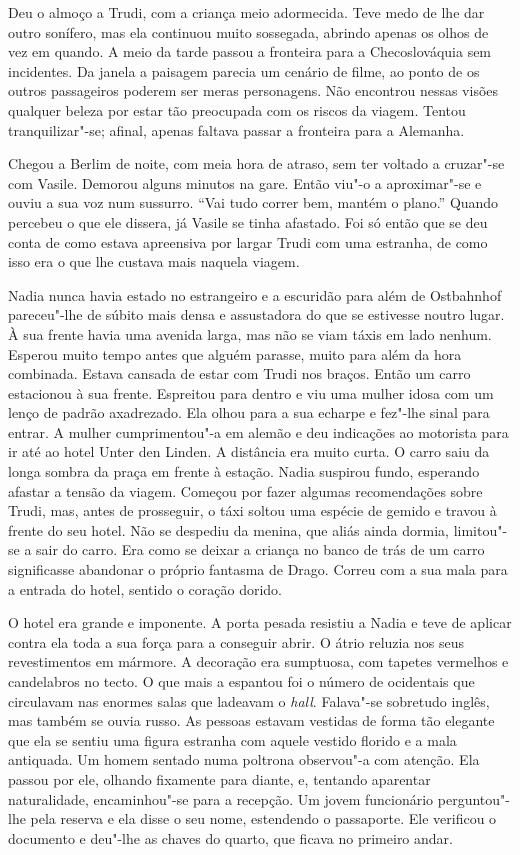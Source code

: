 Deu o almoço a Trudi, com a criança meio adormecida. Teve medo de lhe
dar outro sonífero, mas ela continuou muito sossegada, abrindo apenas os
olhos de vez em quando. A meio da tarde passou a fronteira para a Checoslováquia sem incidentes. Da janela a paisagem parecia um cenário de
filme, ao ponto de os outros passageiros poderem ser meras personagens.
Não encontrou nessas visões qualquer beleza por estar tão preocupada com
os riscos da viagem. Tentou tranquilizar"-se; afinal, apenas faltava
passar a fronteira para a Alemanha.

Chegou a Berlim de noite, com meia hora de atraso, sem ter voltado a
cruzar"-se com Vasile. Demorou alguns minutos na gare. Então viu"-o a
aproximar"-se e ouviu a sua voz num sussurro. ``Vai tudo correr bem,
mantém o plano.'' Quando percebeu o que ele dissera, já Vasile se tinha
afastado. Foi só então que se deu conta de como estava apreensiva
por largar Trudi com uma estranha, de como isso era o que lhe custava
mais naquela viagem.

Nadia nunca havia estado no estrangeiro e a escuridão para além de
Ostbahnhof pareceu"-lhe de súbito mais densa e assustadora do que se
estivesse noutro lugar. À sua frente havia uma avenida larga, mas não se
viam táxis em lado nenhum. Esperou muito tempo antes que alguém parasse,
muito para além da hora combinada. Estava cansada de estar com Trudi nos
braços. Então um carro estacionou à sua frente. Espreitou para dentro e
viu uma mulher idosa com um lenço de padrão axadrezado. Ela olhou para a
sua echarpe e fez"-lhe sinal para entrar. A mulher cumprimentou"-a em
alemão e deu indicações ao motorista para ir até ao hotel Unter den
Linden. A distância era muito curta. O carro saiu da longa sombra da
praça em frente à estação. Nadia suspirou fundo, esperando afastar a
tensão da viagem. Começou por fazer algumas recomendações sobre Trudi,
mas, antes de prosseguir, o táxi soltou uma espécie de gemido e travou à
frente do seu hotel. Não se despediu da menina, que aliás ainda dormia,
limitou"-se a sair do carro. Era como se deixar a criança no banco de
trás de um carro significasse abandonar o próprio fantasma de Drago.
Correu com a sua mala para a entrada do hotel, sentido o coração dorido.

O hotel era grande e imponente. A porta pesada resistiu
a Nadia e teve de aplicar contra ela toda a sua força para a conseguir
abrir. O átrio reluzia nos seus revestimentos em mármore. A decoração
era sumptuosa, com tapetes vermelhos e candelabros no tecto. O que mais
a espantou foi o número de ocidentais que circulavam nas enormes salas
que ladeavam o \emph{hall}. Falava"-se sobretudo inglês, mas também se
ouvia russo. As pessoas estavam vestidas de
forma tão elegante que ela se sentiu uma figura estranha com aquele
vestido florido e a mala antiquada. Um homem sentado numa poltrona
observou"-a com atenção. Ela passou por ele, olhando fixamente para
diante, e, tentando aparentar naturalidade, encaminhou"-se para a
recepção. Um jovem funcionário perguntou"-lhe pela reserva e ela disse o
seu nome, estendendo o passaporte. Ele verificou o documento e deu"-lhe
as chaves do quarto, que ficava no primeiro andar.

